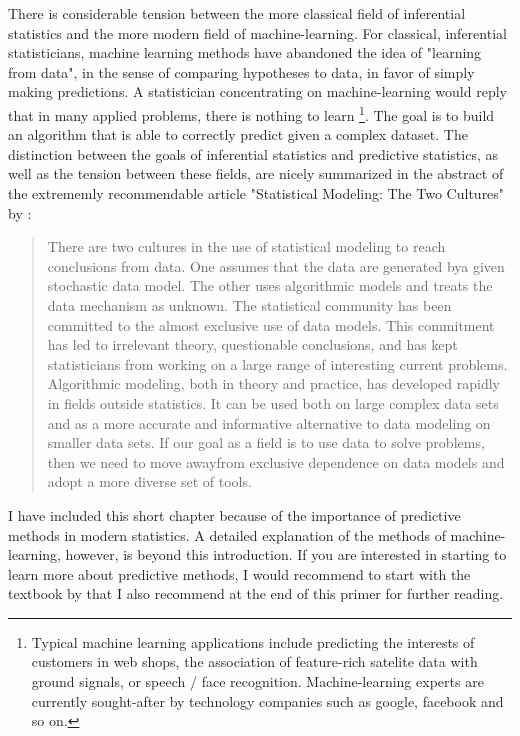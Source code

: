 \documentclass[a4paper,twoside]{tufte-book}\usepackage[]{graphicx}\usepackage[]{color}
\begin{document}
{There is considerable tension between the more classical field of inferential statistics and the more modern field of machine-learning. For classical, inferential statisticians, machine learning methods have abandoned the idea of "learning from data", in the sense of comparing hypotheses to data, in favor of simply making predictions. A statistician concentrating on machine-learning would reply that in many applied problems, there is nothing to learn \footnote{Typical machine learning applications include predicting the interests of customers in web shops, the association of feature-rich satelite data with ground signals, or speech / face recognition. Machine-learning experts are currently sought-after by technology companies such as google, facebook and so on.}. The goal is to build an algorithm that is able to correctly predict given a complex dataset. The distinction between the goals of inferential statistics and predictive statistics, as well as the tension between these fields, are nicely summarized in the abstract of the extrememly recommendable article "Statistical Modeling: The Two Cultures" by \citet{Breiman-StatisticalModelingTwo-2001}:

\begin{quote}
There are two cultures in the use of statistical modeling to reach conclusions from data. One assumes that the data are generated bya given stochastic data model. The other uses algorithmic models and treats the data mechanism as unknown. The statistical community has been committed to the almost exclusive use of data models. This commitment has led to irrelevant theory, questionable conclusions, and has kept statisticians from working on a large range of interesting current problems. Algorithmic modeling, both in theory and practice, has developed rapidly in fields outside statistics. It can be used both on large complex data sets and as a more accurate and informative alternative to data modeling on smaller data sets. If our goal as a field is to use data to solve problems, then we need to move awayfrom exclusive dependence on data models and adopt a more diverse set of tools.
\end{quote}


I have included this short chapter because of the importance of predictive methods in modern statistics. A detailed explanation of the methods of machine-learning, however, is beyond this introduction. If you are interested in starting to learn more about predictive methods, I would recommend to start with the textbook by  \citet{James-IntroductiontoStatistical-2013} that I also recommend at the end of this primer for further reading. 

}
\end{document}
